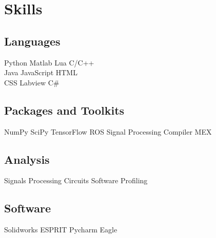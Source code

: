 \documentclass[letterpaper]{deedy-resume} %
\begin{document}
\begin{minipage}[t]{0.33\textwidth}
\sectionspace %


\section{Skills}

\subsection{Languages}

Python \textbullet{} Matlab \textbullet{} Lua \textbullet{} C/C++ \\ 
Java \textbullet{} JavaScript \textbullet{} HTML \\
CSS \textbullet{} Labview \textbullet{} C\# \\

\subsection{Packages and Toolkits}
NumPy \textbullet{} SciPy \textbullet{} TensorFlow \textbullet{} ROS
Signal Processing \textbullet{} Compiler \textbullet{} MEX

\subsection{Analysis}
Signals Processing \textbullet{} Circuits \textbullet{} Software Profiling

\subsection{Software}
Solidworks \textbullet{} ESPRIT \textbullet{} Pycharm \textbullet{} Eagle

\sectionspace %


\end{minipage} %
\hfill
%
%
\end{document}
